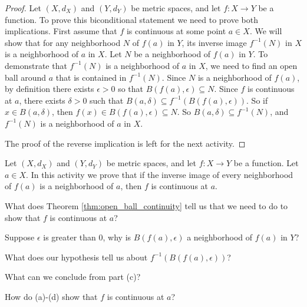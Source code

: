 \begin{proof} Let $(X, d_X)$ and $(Y,d_Y)$ be metric spaces, and let $f : X \to Y$ be a function. To prove this biconditional statement we need to prove both implications. First assume that $f$ is continuous at some point $a \in X$. We will show that for any neighborhood $N$ of $f(a)$ in $Y$, its inverse image $f^{-1}(N)$ in $X$ is a neighborhood of $a$ in $X$. Let $N$ be a neighborhood of $f(a)$ in $Y$. To demonstrate that $f^{-1}(N)$ is a neighborhood of $a$ in $X$, we need to find an open ball around $a$ that is contained in $f^{-1}(N)$. Since $N$ is a neighborhood of $f(a)$, by definition there exists $\epsilon > 0$ so that $B(f(a), \epsilon) \subseteq N$. Since $f$ is continuous at $a$, there exists $\delta > 0$ such that $B(a, \delta) \subseteq f^{-1}\left(B(f(a), \epsilon)\right)$. So if $x \in B(a, \delta)$, then $f(x) \in B(f(a), \epsilon) \subseteq N$. So $B(a, \delta) \subseteq f^{-1}(N)$, and $f^{-1}(N)$ is a neighborhood of $a$ in $X$. 

The proof of the reverse implication is left for the next activity.
\end{proof}



\begin{activity} Let $(X, d_X)$ and $(Y,d_Y)$ be metric spaces, and let $f : X \to Y$ be a function. Let $a \in X$. In this activity we prove that if the inverse image of every neighborhood of $f(a)$ is a neighborhood of $a$, then $f$ is continuous at $a$.
\ba
\item What does Theorem \ref{thm:open_ball_continuity} tell us that we need to do to show that $f$ is continuous at $a$?

\item Suppose $\epsilon$ is greater than 0, why is $B(f(a), \epsilon)$ a neighborhood of $f(a)$ in $Y$?

\item What does our hypothesis tell us about $f^{-1}\left(B(f(a), \epsilon)\right)$?

\item What can we conclude from part (c)?

\item How do (a)-(d) show that $f$ is continuous at $a$?

\ea

\end{activity}

